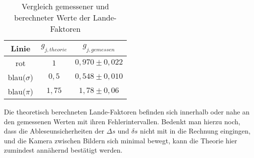 \begin{table}
    \centering
    \caption{Vergleich gemessener und berechneter Werte der Lande-Faktoren}
    \label{tab:Endergebnisse}
    \begin{tabular}{ccc}
        \toprule
        Linie & $g_{j,theorie}$ & $g_{j,gemessen}$\\
        \midrule
        rot             & $1$       & $0,970\pm 0,022$\\
        blau($\sigma$)  & $0,5$     & $0,548\pm 0,010$\\
        blau($\pi$)     & $1,75$    & $1,78\pm 0,06$\\
        \bottomrule
    \end{tabular}
\end{table}
Die theoretisch berechneten Lande-Faktoren befinden sich innerhalb oder nahe an den gemessenen Werten mit ihren Fehlerintervallen.
Bedenkt man hierzu noch, dass die Ableseunsicherheiten der $\Delta s$ und $\delta s$ nicht mit in die Rechnung eingingen,
und die Kamera zwischen Bildern sich minimal bewegt, kann die Theorie hier zumindest annähernd bestätigt werden.